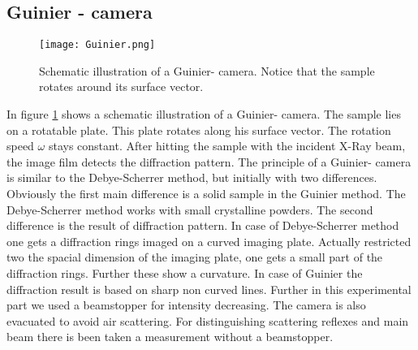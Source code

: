 	\subsection{Guinier - camera}
	\begin{figure}
		\centering
		\texttt{[image: Guinier.png]}
		\caption[Schematic illustration of a Guinier- camera]{Schematic illustration of a Guinier- camera. Notice that the sample rotates around its surface vector.}
		\label{Guinier}
	\end{figure}
	In figure \ref{Guinier} shows a schematic illustration of a Guinier- camera. The sample lies on a rotatable plate. This plate rotates along his surface vector. The rotation speed $\omega$ stays constant. After hitting the sample with the incident X-Ray beam, the image film detects the diffraction pattern. The principle of a Guinier- camera is similar to the Debye-Scherrer method, but initially with two differences. Obviously the first main difference is a solid sample in the Guinier method. The Debye-Scherrer method works with small crystalline powders. The second difference is the result of diffraction pattern. In case of Debye-Scherrer method one gets a diffraction rings imaged on a curved imaging plate. Actually restricted two the spacial dimension of the imaging plate, one gets a small part of the diffraction rings. Further these show a curvature. In case of Guinier the diffraction result is based on sharp non curved lines. Further in this experimental part we used a beamstopper for intensity decreasing. The camera is also evacuated to avoid air scattering. For distinguishing scattering reflexes and main beam there is been taken a measurement without a beamstopper.
